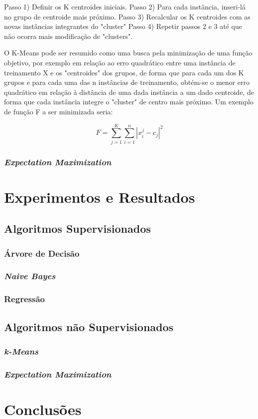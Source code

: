 \documentclass{article}
\begin{document}
	Passo 1) Definir os K centroides iniciais.
	Passo 2) Para cada instância, inseri-lá no grupo de centroide mais próximo.
	Passo 3) Recalcular os K centroides com as novas instâncias integrantes do "cluster"
	Passo 4) Repetir passos 2 e 3 até que não ocorra mais modificação de "clusters".

O K-Means pode ser resumido como uma busca pela minimização de uma função objetivo, por exemplo em relação ao erro quadrático entre uma instância de treinamento X e os "centroides" dos grupos, de forma que para cada um dos K grupos e para cada uma das n instâncias de treinamento, obtém-se o menor erro quadrático em relação à distância de uma dada instância a um dado centroide, de forma que cada instância integre o "cluster" de centro mais próximo. Um exemplo de função F a ser minimizada seria:

\begin{equation}
F = \sum_{j=1}^{K} \sum_{i=1}^{n} {|{x}_{i}^{j} - c_{j}|}^2
\end{equation}

\subsubsection{{\b \it Expectation Maximization}}

\section{Experimentos e Resultados}

\subsection{Algoritmos Supervisionados}

\subsubsection{Árvore de Decisão}

\subsubsection{{\b \it Naive Bayes}}

\subsubsection{Regressão}

\subsection{Algoritmos não Supervisionados}

\subsubsection{{\b \it k-Means}}

\subsubsection{{\b \it Expectation Maximization}}

\section{Conclusões}


\end{document}
